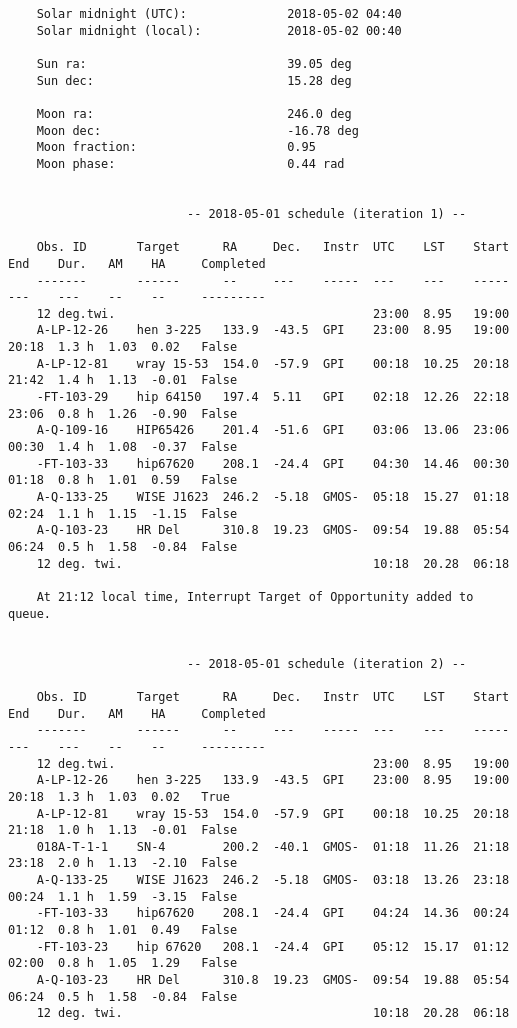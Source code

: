 \documentclass{article}
\begin{document}
\begin{lstlisting}
	Solar midnight (UTC):              2018-05-02 04:40
	Solar midnight (local):            2018-05-02 00:40
	
	Sun ra:                            39.05 deg
	Sun dec:                           15.28 deg
	
	Moon ra:                           246.0 deg
	Moon dec:                          -16.78 deg
	Moon fraction:                     0.95
	Moon phase:                        0.44 rad
	
	
	                     -- 2018-05-01 schedule (iteration 1) --
	
	Obs. ID       Target      RA     Dec.   Instr  UTC    LST    Start  End    Dur.   AM    HA     Completed 
	-------       ------      --     ---    -----  ---    ---    -----  ---    ---    --    --     --------- 
	12 deg.twi.                                    23:00  8.95   19:00                                       
	A-LP-12-26    hen 3-225   133.9  -43.5  GPI    23:00  8.95   19:00  20:18  1.3 h  1.03  0.02   False     
	A-LP-12-81    wray 15-53  154.0  -57.9  GPI    00:18  10.25  20:18  21:42  1.4 h  1.13  -0.01  False     
	-FT-103-29    hip 64150   197.4  5.11   GPI    02:18  12.26  22:18  23:06  0.8 h  1.26  -0.90  False     
	A-Q-109-16    HIP65426    201.4  -51.6  GPI    03:06  13.06  23:06  00:30  1.4 h  1.08  -0.37  False     
	-FT-103-33    hip67620    208.1  -24.4  GPI    04:30  14.46  00:30  01:18  0.8 h  1.01  0.59   False     
	A-Q-133-25    WISE J1623  246.2  -5.18  GMOS-  05:18  15.27  01:18  02:24  1.1 h  1.15  -1.15  False     
	A-Q-103-23    HR Del      310.8  19.23  GMOS-  09:54  19.88  05:54  06:24  0.5 h  1.58  -0.84  False     
	12 deg. twi.                                   10:18  20.28  06:18                                       
	
	At 21:12 local time, Interrupt Target of Opportunity added to queue.
	
	
	                     -- 2018-05-01 schedule (iteration 2) --
	
	Obs. ID       Target      RA     Dec.   Instr  UTC    LST    Start  End    Dur.   AM    HA     Completed 
	-------       ------      --     ---    -----  ---    ---    -----  ---    ---    --    --     --------- 
	12 deg.twi.                                    23:00  8.95   19:00                                       
	A-LP-12-26    hen 3-225   133.9  -43.5  GPI    23:00  8.95   19:00  20:18  1.3 h  1.03  0.02   True      
	A-LP-12-81    wray 15-53  154.0  -57.9  GPI    00:18  10.25  20:18  21:18  1.0 h  1.13  -0.01  False     
	018A-T-1-1    SN-4        200.2  -40.1  GMOS-  01:18  11.26  21:18  23:18  2.0 h  1.13  -2.10  False     
	A-Q-133-25    WISE J1623  246.2  -5.18  GMOS-  03:18  13.26  23:18  00:24  1.1 h  1.59  -3.15  False     
	-FT-103-33    hip67620    208.1  -24.4  GPI    04:24  14.36  00:24  01:12  0.8 h  1.01  0.49   False     
	-FT-103-23    hip 67620   208.1  -24.4  GPI    05:12  15.17  01:12  02:00  0.8 h  1.05  1.29   False     
	A-Q-103-23    HR Del      310.8  19.23  GMOS-  09:54  19.88  05:54  06:24  0.5 h  1.58  -0.84  False     
	12 deg. twi.                                   10:18  20.28  06:18                                       
	

\end{lstlisting}
\end{document}
